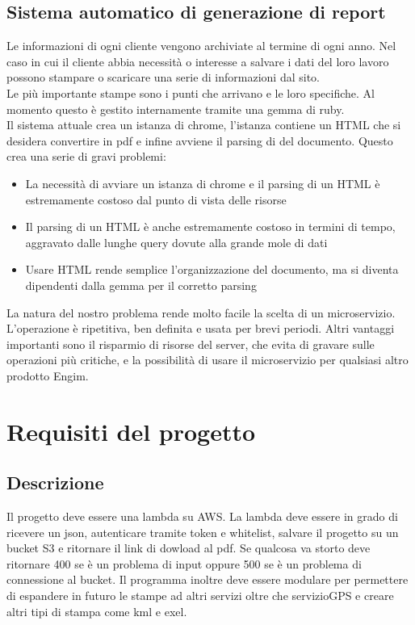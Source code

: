 \documentclass[12pt]{article}
\begin{document}
\subsection{Sistema automatico di generazione di report}
Le informazioni di ogni cliente vengono archiviate al termine di ogni anno. Nel 
caso in cui
il cliente abbia necessità o interesse a salvare i dati del loro lavoro possono
stampare o scaricare una serie di informazioni dal sito. 
\\ Le più importante stampe
sono i punti che arrivano e le loro specifiche. Al momento questo è gestito
internamente tramite una gemma di ruby. 
\\ Il sistema attuale crea un istanza di chrome, l'istanza contiene un HTML
che si desidera convertire in pdf e infine avviene il parsing di del documento.
Questo crea una serie di gravi problemi:
\begin{itemize}
  \item La necessità di avviare un istanza di chrome e il parsing di un HTML è
  estremamente costoso dal punto di vista delle risorse
  \item Il parsing di un HTML è anche estremamente costoso in termini di tempo,
  aggravato dalle lunghe query dovute alla grande mole di dati 
  \item Usare HTML rende semplice l'organizzazione del documento, ma si diventa 
  dipendenti dalla gemma per il corretto parsing
\end{itemize}
La natura del nostro problema rende molto facile la scelta di un microservizio.
L'operazione è ripetitiva, ben definita e usata per brevi periodi. Altri vantaggi 
importanti sono il risparmio di risorse del server, che evita di gravare sulle 
operazioni più critiche, e la possibilità di usare il microservizio per qualsiasi 
altro prodotto Engim.



\section{Requisiti del progetto}
\subsection{Descrizione}
Il progetto deve essere una lambda su AWS. La lambda deve essere in grado di
ricevere un json, autenticare tramite token e whitelist, salvare il progetto su
un bucket S3 e ritornare il link di dowload al pdf. Se qualcosa va storto deve
ritornare 400 se è un problema di input oppure 500 se è un problema di connessione
al bucket.
Il programma inoltre deve essere modulare per permettere di espandere in futuro
le stampe ad altri servizi oltre che servizioGPS e creare altri tipi di stampa
come kml e exel.
\end{document}
